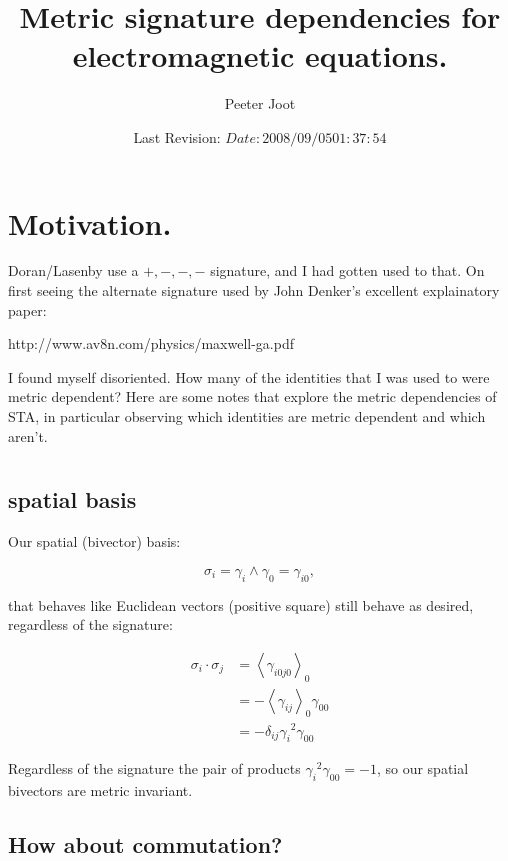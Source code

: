 \documentclass{article}
\title{ Metric signature dependencies for electromagnetic equations. }
\author{Peeter Joot}
\date{ Last Revision: $Date: 2008/09/05 01:37:54 $ }
\newcommand{\gpgrade}[2] {{\left\langle{{#1}}\right\rangle}_{#2}}
\newcommand{\gpgradezero}[1] {\gpgrade{#1}{0}}
\begin{document}
\maketitle{}

\section{ Motivation. }

Doran/Lasenby use a $+,-,-,-$ signature, and I had gotten used to that.  On first seeing the alternate signature used by John Denker's excellent 
explainatory paper:

http://www.av8n.com/physics/maxwell-ga.pdf

I found myself disoriented.  How many of the identities that I was used to were metric dependent?   Here are some notes that explore the 
metric dependencies of STA, in particular observing which identities are metric dependent and which aren't.

\section{}

\subsection{ spatial basis }

Our spatial (bivector) basis:

\begin{equation*}
\sigma_i = \gamma_i \wedge \gamma_0 = \gamma_{i0},
\end{equation*}

that behaves like Euclidean vectors (positive square) still behave as desired, regardless of the signature:

\begin{align*}
\sigma_i \cdot \sigma_j 
&= \gpgradezero{\gamma_{i0j0}}  \\
&= - \gpgradezero{\gamma_{ij}} \gamma_{00}  \\
&= -\delta_{ij} {\gamma_i}^2 \gamma_{00}
\end{align*}

Regardless of the signature the pair of products ${\gamma_i}^2 \gamma_{00} = -1$, so our spatial bivectors are metric invariant.

\subsection{ How about commutation? }
\end{document}
